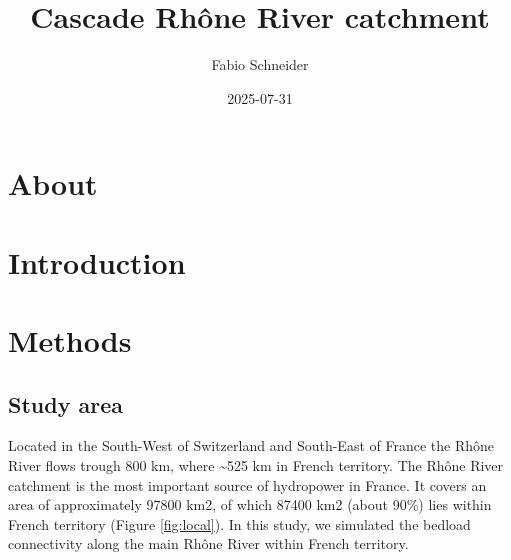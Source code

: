 \documentclass[
]{book}
\title{Cascade Rhône River catchment}
\author{Fabio Schneider}
\date{2025-07-31}
\begin{document}
\maketitle

{
\setcounter{tocdepth}{1}
\tableofcontents
}
\chapter*{About}\label{about}

\chapter{Introduction}\label{introduction}

\chapter{Methods}\label{methods}

\section{Study area}\label{study-area}

Located in the South-West of Switzerland and South-East of France the Rhône River flows trough 800 km, where \textasciitilde525 km in French territory. The Rhône River catchment is the most important source of hydropower in France. It covers an area of approximately 97800 km2, of which 87400 km2 (about 90\%) lies within French territory (Figure \ref{fig:local}). In this study, we simulated the bedload connectivity along the main Rhône River within French territory.
\end{document}

